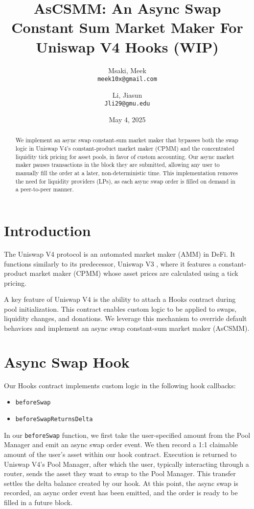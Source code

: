 \documentclass[bibliography=numbered]{article}
\title{AsCSMM: An Async Swap Constant Sum Market Maker For Uniswap V4 Hooks (WIP)}
\author{
  Msaki, Meek\\
  \texttt{meek10x@gmail.com}
  \and
  Li, Jiasun\\
  \texttt{Jli29@gmu.edu}
}
\date{May 4, 2025}
\begin{document}
\maketitle

\begin{abstract}
    We implement an async swap constant-sum market maker that bypasses both the swap logic in Uniswap V4’s constant-product market maker (CPMM) and the concentrated liquidity tick pricing for asset pools, in favor of custom accounting. Our async market maker pauses transactions in the block they are submitted, allowing any user to manually fill the order at a later, non-deterministic time. This implementation removes the need for liquidity providers (LPs), as each async swap order is filled on demand in a peer-to-peer manner.
\end{abstract}

\section{Introduction}

The Uniswap V4 \cite{UniswapV4} protocol is an automated market maker (AMM) in DeFi. It functions similarly to its predecessor, Uniswap V3 \cite{UniswapV3}, where it features a constant-product market maker (CPMM) whose asset prices are calculated using a tick pricing.  

A key feature of Uniswap V4 is the ability to attach a Hooks contract during pool initialization. This contract enables custom logic to be applied to swaps, liquidity changes, and donations. We leverage this mechanism to override default behaviors and implement an async swap constant-sum market maker (AsCSMM).

\section{Async Swap Hook}

Our Hooks contract implements custom logic in the following hook callbacks:

\begin{itemize}
\item \texttt{beforeSwap}
\item \texttt{beforeSwapReturnsDelta}
\end{itemize}

In our \texttt{beforeSwap} function, we first take the user-specified amount from the Pool Manager and emit an async swap order event. We then record a 1:1 claimable amount of the user's asset within our hook contract. Execution is returned to Uniswap V4’s Pool Manager, after which the user, typically interacting through a router, sends the asset they want to swap to the Pool Manager. This transfer settles the delta balance created by our hook. At this point, the async swap is recorded, an async order event has been emitted, and the order is ready to be filled in a future block.
\end{document}
